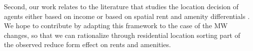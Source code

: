 Second, our work relates to the literature that studies the location decision of agents either based on income \parencite{roback1982wages, kennan2011effect, desmet2013urban, perez2018city} or based on spatial rent and amenity differentials \parencite{diamond2016determinants,almagro2019location,couture2019income, bayer2004equilibrium}. We hope to contribute by adapting this framework to the case of the MW changes, so that we can rationalize through residential location sorting part of the observed reduce form effect on rents and amenities. 

